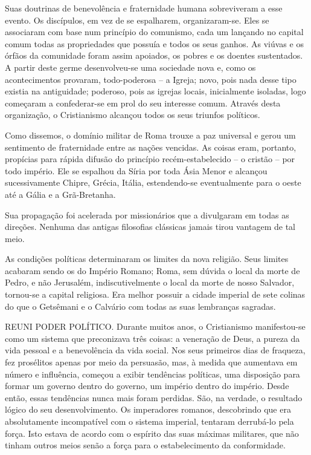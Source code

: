 \documentclass[11pt,a5paper,twoside,openany]{book}
\begin{document}
Suas doutrinas de benevolência e fraternidade humana sobreviveram a esse evento. Os discípulos, em vez de se espalharem, organizaram-se. Eles se associaram com base num princípio do comunismo, cada um lançando no capital comum todas as propriedades que possuía e todos os seus ganhos. As viúvas e os órfãos da comunidade foram assim apoiados, os pobres e os doentes sustentados. A partir deste germe desenvolveu-se uma sociedade nova e, como os acontecimentos provaram, todo-poderosa – a Igreja; novo, pois nada desse tipo existia na antiguidade; poderoso, pois as igrejas locais, inicialmente isoladas, logo começaram a confederar-se em prol do seu interesse comum. Através desta organização, o Cristianismo alcançou todos os seus triunfos políticos.

Como dissemos, o domínio militar de Roma trouxe a paz universal e gerou um sentimento de fraternidade entre as nações vencidas. As coisas eram, portanto, propícias para rápida difusão do princípio recém-estabelecido – o cristão – por todo império. Ele se espalhou da Síria por toda Ásia Menor e alcançou sucessivamente Chipre, Grécia, Itália, estendendo-se eventualmente para o oeste até a Gália e a Grã-Bretanha.

Sua propagação foi acelerada por missionários que a divulgaram em todas as direções. Nenhuma das antigas filosofias clássicas jamais tirou vantagem de tal meio.

As condições políticas determinaram os limites da nova religião. Seus limites acabaram sendo os do Império Romano; Roma, sem dúvida o local da morte de Pedro, e não Jerusalém, indiscutivelmente o local da morte de nosso Salvador, tornou-se a capital religiosa. Era melhor possuir a cidade imperial de sete colinas do que o Getsêmani e o Calvário com todas as suas lembranças sagradas.

REUNI PODER POLÍTICO. Durante muitos anos, o Cristianismo manifestou-se como um sistema que preconizava três coisas: a veneração de Deus, a pureza da vida pessoal e a benevolência da vida social. Nos seus primeiros dias de fraqueza, fez prosélitos apenas por meio da persuasão, mas, à medida que aumentava em número e influência, começou a exibir tendências políticas, uma disposição para formar um governo dentro do governo, um império dentro do império. Desde então, essas tendências nunca mais foram perdidas. São, na verdade, o resultado lógico do seu desenvolvimento. Os imperadores romanos, descobrindo que era absolutamente incompatível com o sistema imperial, tentaram derrubá-lo pela força. Isto estava de acordo com o espírito das suas máximas militares, que não tinham outros meios senão a força para o estabelecimento da conformidade.
\end{document}

